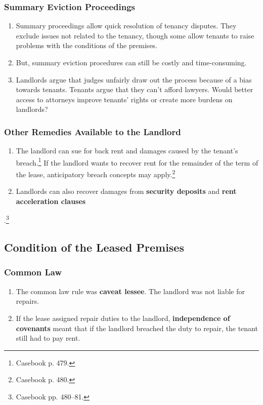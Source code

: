 \subsubsection{Summary Eviction Proceedings} 

\begin{enumerate}
    \item Summary proceedings allow quick resolution of tenancy disputes. They 
    exclude issues not related to the tenancy, though some allow tenants to 
    raise problems with the conditions of the premises.
    \item But, summary eviction procedures can still be costly and 
    time-consuming.
    \item Landlords argue that judges unfairly draw out the process because of 
    a bias towards tenants. Tenants argue that they can't afford lawyers.  
    Would better access to attorneys improve tenants' rights or create more 
    burdens on landlords?
\end{enumerate}

\subsubsection{Other Remedies Available to the Landlord}

\begin{enumerate}
    \item The landlord can sue for back rent and damages caused by the 
    tenant's breach.\footnote{Casebook p. 479.} If the landlord wants to 
    recover rent for the remainder of the term of the lease, anticipatory 
    breach concepts may apply.\footnote{Casebook p. 480.}
    \item Landlords can also recover damages from \textbf{security deposits} 
    and \textbf{rent acceleration clauses}
\end{enumerate}.\footnote{Casebook pp. 480--81.}

\subsection{Condition of the Leased Premises} %

\subsubsection{Common Law}

\begin{enumerate}
    \item The common law rule was \textbf{caveat lessee}. The landlord was not 
    liable for repairs.
    \item If the lease assigned repair duties to the landlord, 
    \textbf{independence of covenants} meant that if the landlord breached the 
    duty to repair, the tenant still had to pay rent.
\end{enumerate}

